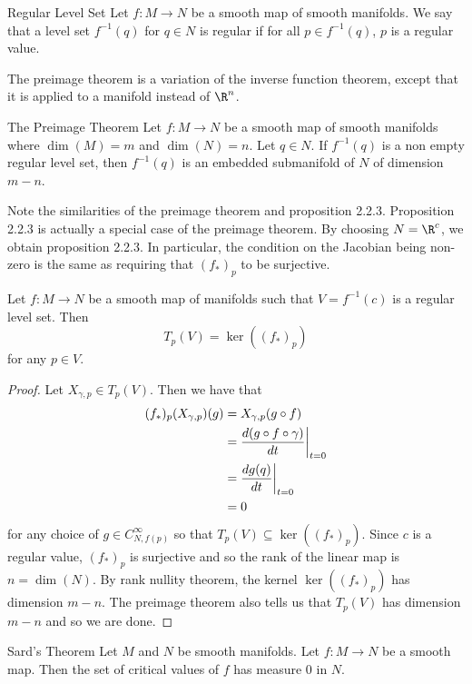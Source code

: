 \documentclass[a4paper]{article}
\begin{document}
\begin{defn}{Regular Level Set}{} Let $f:M\to N$ be a smooth map of smooth manifolds. We say that a level set $f^{-1}(q)$ for $q\in N$ is regular if for all $p\in f^{-1}(q)$, $p$ is a regular value. 
\end{defn}

The preimage theorem is a variation of the inverse function theorem, except that it is applied to a manifold instead of $\R^n$. 

\begin{thm}{The Preimage Theorem}{} Let $f:M\to N$ be a smooth map of smooth manifolds where $\dim(M)=m$ and $\dim(N)=n$. Let $q\in N$. If $f^{-1}(q)$ is a non empty regular level set, then $f^{-1}(q)$ is an embedded submanifold of $N$ of dimension $m-n$. 
\end{thm}

Note the similarities of the preimage theorem and proposition 2.2.3. Proposition 2.2.3 is actually a special case of the preimage theorem. By choosing $N=\R^c$, we obtain proposition 2.2.3. In particular, the condition on the Jacobian being non-zero is the same as requiring that $(f_\ast)_p$ to be surjective. 

\begin{prp}{}{} Let $f:M\to N$ be a smooth map of manifolds such that $V=f^{-1}(c)$ is a regular level set. Then $$T_p(V)=\ker((f_\ast)_p)$$ for any $p\in V$. 
\begin{proof}
Let $X_{\gamma,p}\in T_p(V)$. Then we have that 
\begin{align*}
(f_\ast)_p(X_{\gamma,p})(g)&=X_{\gamma,p}(g\circ f)\\
&=\frac{d(g\circ f\circ\gamma)}{dt}\bigg{|}_{t=0}\\
&=\frac{dg(q)}{dt}\bigg{|}_{t=0}\\
&=0
\end{align*}
for any choice of $g\in C_{N,f(p)}^\infty$ so that $T_p(V)\subseteq\ker((f_\ast)_p)$. Since $c$ is a regular value, $(f_\ast)_p$ is surjective and so the rank of the linear map is $n=\dim(N)$. By rank nullity theorem, the kernel $\ker((f_\ast)_p)$ has dimension $m-n$. The preimage theorem also tells us that $T_p(V)$ has dimension $m-n$ and so we are done. 
\end{proof}
\end{prp}

\begin{thm}{Sard's Theorem}{} Let $M$ and $N$ be smooth manifolds. Let $f:M\to N$ be a smooth map. Then the set of critical values of $f$ has measure $0$ in $N$. 
\end{thm}
\end{document}
